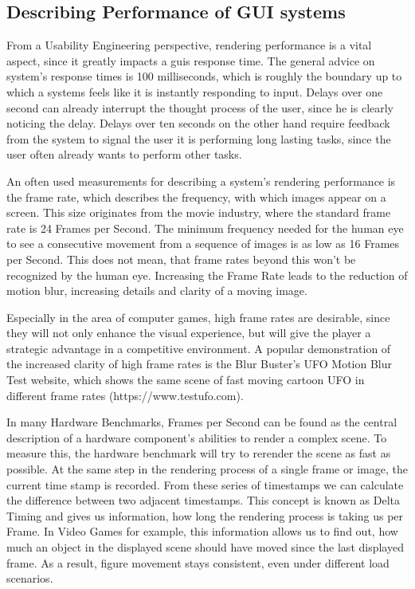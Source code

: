 \subsection{Describing Performance of GUI systems}
\label{sec:application:analysis:performance}

From a Usability Engineering perspective, rendering performance is a vital
aspect, since it greatly impacts a \glspl{gui} response time. The general advice
on system's response times is 100 milliseconds, which is roughly the boundary
up to which a systems feels like it is instantly responding to input. Delays
over one second can already interrupt the thought process of the user, since he
is clearly noticing the delay. Delays over ten seconds on the other hand require
feedback from the system to signal the user it is performing long lasting tasks,
since the user often already wants to perform other tasks.
\cite{UsabilityEngineering}

An often used measurements for describing a system's rendering performance is the
frame rate, which describes the frequency, with which images appear on a screen.
This size originates from the movie industry, where the standard frame rate is 24
Frames per Second. The minimum frequency needed for the human eye to see a
consecutive movement from a sequence of images is as low as 16 Frames per
Second. This does not mean, that frame rates beyond this won't be recognized by
the human eye. Increasing the Frame Rate leads to the reduction of motion blur,
increasing details and clarity of a moving image.

Especially in the area of computer games, high frame rates are desirable, since
they will not only enhance the visual experience, but will give the player a
strategic advantage in a competitive environment.  A popular demonstration of
the increased clarity of high frame rates is the Blur Buster's UFO Motion Blur
Test website, which shows the same scene of fast moving cartoon UFO in different
frame rates (https://www.testufo.com).

In many Hardware Benchmarks, Frames per Second can be found as the central
description of a hardware component's abilities to render a complex scene. To
measure this, the hardware benchmark will try to rerender the scene as fast as
possible. At the same step in the rendering process of a single frame or image,
the current time stamp is recorded. From these series of timestamps we can
calculate the difference between two adjacent timestamps. This concept is known
as Delta Timing and gives us information, how long the rendering process is
taking us per Frame. In Video Games for example, this information allows us to
find out, how much an object in the displayed scene should have moved since the
last displayed frame. As a result, figure movement stays consistent, even under
different load scenarios.
\cite{DeltaTiming}

